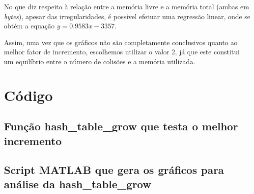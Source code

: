 \documentclass[portuguese,11pt,a4paper,titlepage]{article}
\newcommand{\srcdir}{..}
\newcommand{\hashtablegrowdir}{\srcdir/hash\_table\_grow-test}
\begin{document}
No que diz respeito à relação entre a memória livre e a memória total (ambas em \textit{bytes}), apesar das irregularidades, é possível efetuar uma regressão linear, onde se obtém a equação \begin{math}y=0.9583x-3357\end{math}.

Assim, uma vez que os gráficos não são completamente conclusivos quanto ao melhor fator de incremento, escolhemos utilizar o valor 2, já que este constitui um equilíbrio entre o número de colisões e a memória utilizada.

\pagebreak
\section{Código}
\subsection{Função hash\_table\_grow que testa o melhor incremento}

\pagebreak
\subsection{Script MATLAB que gera os gráficos para análise da hash\_table\_grow} \label{MATLABcode}

\end{document}
